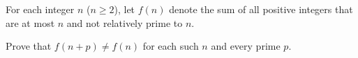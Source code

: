 For each integer $n$ ($n \ge 2$), let $f(n)$ denote the sum of all positive integers that are at most $n$ and not relatively prime to $n$.

Prove that $f(n+p) \neq f(n)$ for each such $n$ and every prime $p$.